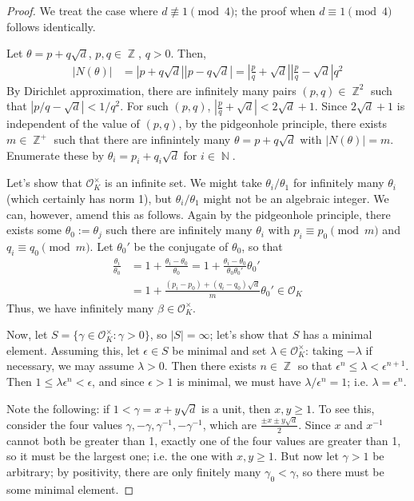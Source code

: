 \documentclass[11pt, a4paper]{memoir}
\DeclareMathOperator{\N}{{\mathbb{N}}}
\DeclareMathOperator{\Z}{{\mathbb{Z}}}
\theoremstyle{change}
\theoremstyle{plain}
\theoremstyle{nonumberplain}
\newtheorem{proof}{Proof}
\numberwithin{equation}{section}
\begin{document}
\begin{proof}
    We treat the case where $d\nequiv 1\pmod{4}$; the proof when $d\equiv 1\pmod{4}$ follows identically.

    Let $\theta=p+q\sqrt{d}$, $p,q\in\Z$, $q>0$.
    Then,
    \begin{align*}
        |N(\theta)| &= |p+q\sqrt{d}||p-q\sqrt{d}| = \left\lvert\frac{p}{q}+\sqrt{d}\right\rvert\left\lvert\frac{p}{q}-\sqrt{d}\right\rvert q^2
    \end{align*}
    By Dirichlet approximation, there are infinitely many pairs $(p,q)\in\Z^2$ such that $|p/q-\sqrt{d}|<1/q^2$.
    For such $(p,q)$, $\left\lvert\frac{p}{q}+\sqrt{d}\right\rvert<2\sqrt{d}+1$.
    Since $2\sqrt{d}+1$ is independent of the value of $(p,q)$, by the pidgeonhole principle, there exists $m\in\Z^+$ such that there are infinintely many $\theta=p+q\sqrt{d}$ with $|N(\theta)|=m$.
    Enumerate these by $\theta_i=p_i+q_i\sqrt{d}$ for $i\in\N$.

    Let's show that $\mathcal{O}_K^\times$ is an infinite set.
    We might take $\theta_i/\theta_1$ for infinitely many $\theta_i$ (which certainly has norm 1), but $\theta_i/\theta_1$ might not be an algebraic integer.
    We can, however, amend this as follows.
    Again by the pidgeonhole principle, there exists some $\theta_0:=\theta_j$ such there are infinitely many $\theta_i$ with $p_i\equiv p_0\pmod{m}$ and $q_i\equiv q_0\pmod{m}$.
    Let $\theta_0'$ be the conjugate of $\theta_0$, so that
    \begin{align*}
        \frac{\theta_i}{\theta_0} &= 1+\frac{\theta_i-\theta_0}{\theta_0}= 1+\frac{\theta_i-\theta_0}{\theta_0\theta_0'}\theta_0'\\
                                  &= 1+\frac{(p_i-p_0)+(q_i-q_0)\sqrt{d}}{m}\theta_0'\in\mathcal{O}_K
    \end{align*}
    Thus, we have infinitely many $\beta\in\mathcal{O}_K^\times$.

    Now, let $S=\{\gamma\in\mathcal{O}_K^\times:\gamma>0\}$, so $|S|=\infty$; let's show that $S$ has a minimal element.
    Assuming this, let $\epsilon\in S$ be minimal and set $\lambda\in\mathcal{O}_K^\times$: taking $-\lambda$ if necessary, we may assume $\lambda>0$.
    Then there exists $n\in\Z$ so that $\epsilon^n\leq\lambda<\epsilon^{n+1}$.
    Then $1\leq\lambda\epsilon^n<\epsilon$, and since $\epsilon>1$ is minimal, we must have $\lambda/\epsilon^n=1$; i.e. $\lambda=\epsilon^n$.

    Note the following: if $1<\gamma=x+y\sqrt{d}$ is a unit, then $x,y\geq 1$.
    To see this, consider the four values $\gamma,-\gamma,\gamma^{-1},-\gamma^{-1}$, which are $\frac{\pm x\pm y\sqrt{d}}{2}$.
    Since $x$ and $x^{-1}$ cannot both be greater than 1, exactly one of the four values are greater than 1, so it must be the largest one; i.e. the one with $x,y\geq 1$.
    But now let $\gamma>1$ be arbitrary; by positivity, there are only finitely many $\gamma_0<\gamma$, so there must be some minimal element.
\end{proof}
\end{document}
